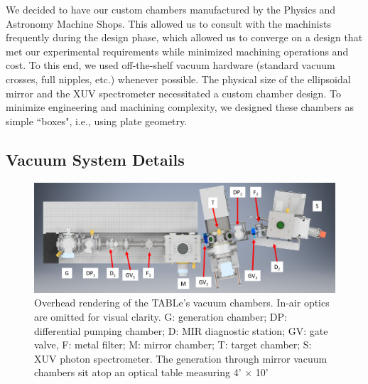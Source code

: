 We decided to have our custom chambers manufactured by the Physics and Astronomy Machine Shops. This allowed us to consult with the machinists frequently during the design phase, which allowed us to converge on a design that met our experimental requirements while minimized machining operations and cost. To this end, we used off-the-shelf vacuum hardware (standard vacuum crosses, full nipples, etc.) whenever possible. The physical size of the ellipsoidal mirror and the XUV spectrometer necessitated a custom chamber design. To minimize engineering and machining complexity, we designed these chambers as simple ``boxes", i.e., using plate geometry.

\subsection{Vacuum System Details}

\begin{figure}
	\centering
	\includegraphics[width=1.0\textwidth]{figures/chap2/TABLe assembly - overhead labeled.png}
	\caption{Overhead rendering of the TABLe's vacuum chambers. In-air optics are omitted for visual clarity. G: generation chamber; DP: differential pumping chamber; D: MIR diagnostic station; GV: gate valve, F: metal filter; M: mirror chamber; T: target chamber; S: XUV photon spectrometer. The generation through mirror vacuum chambers sit atop an optical table measuring 4' $\times$ 10'}
	\label{fig:TABLE_overhead_drawing}
\end{figure}

